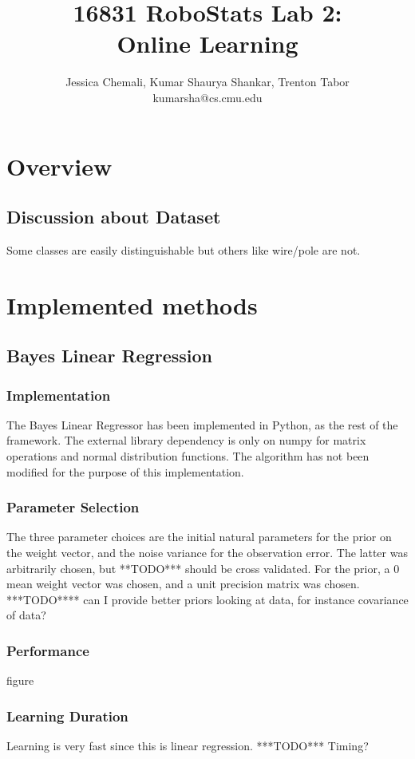 \documentclass[10pt,a4paper]{article}
\author{Jessica Chemali, Kumar Shaurya Shankar, Trenton Tabor\\kumarsha@cs.cmu.edu}
\title{16831 RoboStats Lab 2: \\Online Learning}
\begin{document}
\maketitle
\section{Overview}
\subsection{Discussion about Dataset}
Some classes are easily distinguishable but others like wire/pole are not.
\section{Implemented methods}
\subsection{Bayes Linear Regression}
\subsubsection{Implementation}
The Bayes Linear Regressor has been implemented in Python, as the rest of the framework. The external library dependency is only on numpy for matrix operations and normal distribution functions. The algorithm has not been modified for the purpose of this implementation.
\subsubsection{Parameter Selection}
The three parameter choices are the initial natural parameters for the prior on the weight vector, and the noise variance for the observation error. The latter was arbitrarily chosen, but **TODO*** should be cross validated. For the prior, a 0 mean weight vector was chosen, and a unit precision matrix was chosen. ***TODO**** can I provide better priors looking at data, for instance covariance of data?
\subsubsection{Performance}
figure

\subsubsection{Learning Duration}
Learning is very fast since this is linear regression. ***TODO*** Timing?
\end{document}

